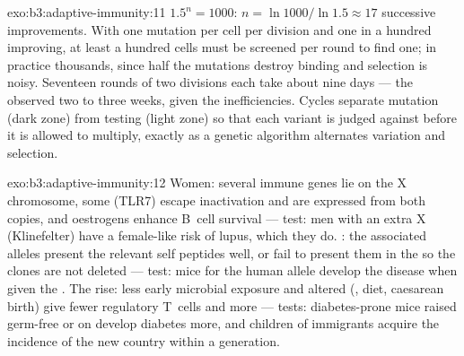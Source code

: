 \begin{solution}{exo:b3:adaptive-immunity:11}
$1.5^{n} = 1000$: $n = \ln 1000/\ln 1.5 \approx 17$ successive
improvements. With one mutation per cell per division and one in a
hundred improving, at least a hundred cells must be screened per round
to find one; in practice thousands, since half the mutations destroy
binding and selection is noisy. Seventeen rounds of two divisions each
take about nine days --- the observed two to three weeks, given the
inefficiencies. Cycles separate mutation (dark zone) from testing
(light zone) so that each variant is judged against  before it
is allowed to multiply, exactly as a genetic algorithm alternates
variation and selection.
\end{solution}

\begin{solution}{exo:b3:adaptive-immunity:12}
Women: several immune genes lie on the X chromosome, some (TLR7)
escape inactivation and are expressed from both copies, and oestrogens
enhance B~cell survival --- test: men with an extra X (Klinefelter)
have a female-like risk of lupus, which they do. : the associated
alleles present the relevant self peptides well, or fail to present
them in the  so the clones are not deleted --- test: mice
 for the human allele develop the disease when given the
. The rise: less early microbial exposure and altered
 (, diet, caesarean birth) give fewer regulatory
T~cells and more  --- tests: diabetes-prone mice raised
germ-free or on  develop diabetes more, and children of
immigrants acquire the incidence of the new country within a
generation.
\end{solution}

